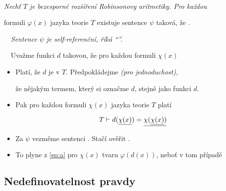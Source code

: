     {\bf {}}\ \ {\it Nechť $T$ je bezesporné rozšíření Robinsonovy aritmetiky. Pro každou
    \smallskip
    
    formuli $\varphi(x)$ jazyka teorie $T$ existuje sentence $\psi$ taková, že .}
    \medskip
    
    {\it {}\ \ Sentence $\psi$ je self-referenční, říká \emph{``''.}}
    \medskip
    
    \ \ Uvažme  funkci $d$ takovou, že pro každou formuli $\chi(x)$
    
    
    
    \begin{itemize}
    \item Platí, že $d$ je  v $T$. Předpokládejme \emph{(pro jednoduchost)},
    \smallskip
    
    že nějakým termem, který si označme $d$, stejně jako funkci $d$.
    \smallskip
    
    \item Pak pro každou formuli $\chi(x)$ jazyka teorie $T$ platí
    
    \begin{equation}\label{eq:a}{T\vdash d(\underline{\chi(x)})=\underline{\chi(\underline{\chi(x)})}}\end{equation}
    
    
    \item Za $\psi$ vezměme sentenci . Stačí ověřit .
    \smallskip
    
    \item To plyne z \eqref{eq:a} pro $\chi(x)$ tvaru $\varphi(d(x))$, neboť v tom případě
    
    
    
    \end{itemize}
    
    
    \subsection*{Nedefinovatelnost pravdy}
